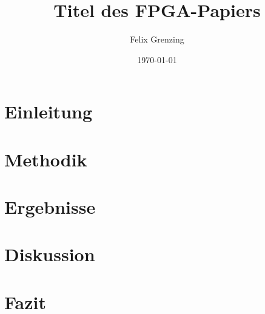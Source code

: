 \documentclass{article}
\title{Titel des FPGA-Papiers} %
\author{Felix Grenzing} %
\date{\today}
\begin{document}
\maketitle

\begin{abstract}
\end{abstract}

\section{Einleitung} %

\section{Methodik} %

\section{Ergebnisse} %

\section{Diskussion} %

\section{Fazit} %

\begin{thebibliography}{9}
\end{thebibliography}
\end{document}
